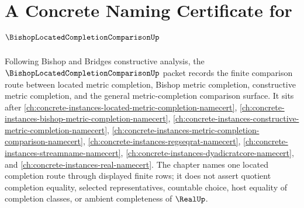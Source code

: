 \chapter{A Concrete Naming Certificate for $\BishopLocatedCompletionComparisonUp$}
\label{ch:concrete-instances-bishop-located-completion-comparison-namecert}

Following Bishop and Bridges constructive analysis, the $\BishopLocatedCompletionComparisonUp$ packet records the finite comparison route between located metric completion, Bishop metric completion, constructive metric completion, and the general metric-completion comparison surface. It sits after \autoref{ch:concrete-instances-located-metric-completion-namecert}, \autoref{ch:concrete-instances-bishop-metric-completion-namecert}, \autoref{ch:concrete-instances-constructive-metric-completion-namecert}, \autoref{ch:concrete-instances-metric-completion-comparison-namecert}, \autoref{ch:concrete-instances-regseqrat-namecert}, \autoref{ch:concrete-instances-streamname-namecert}, \autoref{ch:concrete-instances-dyadicratcore-namecert}, and \autoref{ch:concrete-instances-real-namecert}. The chapter names one located completion route through displayed finite rows; it does not assert quotient completion equality, selected representatives, countable choice, host equality of completion classes, or ambient completeness of $\RealUp$.

